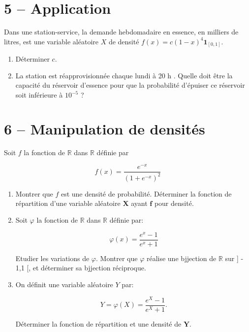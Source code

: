 \vspace{1cm}
\section*{5 -- Application}
Dans une station-service, la demande hebdomadaire en essence, en milliers de litres, est une variable aléatoire $X$ de densité $f(x)=c(1-x)^4 \mathbf{1}_{[0,1]}$.
\begin{enumerate}
  \item Déterminer $c$.

  \item La station est réapprovisionnée chaque lundi à 20 h . Quelle doit être la capacité du réservoir d'essence pour que la probabilité d'épuiser ce réservoir soit inférieure à $10^{-5}$ ?

\end{enumerate}

\vspace{2em}
\section*{6 -- Manipulation de densités}
Soit $f$ la fonction de $\mathbb{R}$ dans $\mathbb{R}$ définie par

$$
f(x)=\frac{e^{-x}}{\left(1+e^{-x}\right)^2}
$$

\begin{enumerate}
  \item Montrer que $f$ est une densité de probabilité. Déterminer la fonction de répartition d'une variable aléatoire $\boldsymbol{X}$ ayant $\boldsymbol{f}$ pour densité.

  \item Soit $\varphi$ la fonction de $\mathbb{R}$ dans $\mathbb{R}$ définie par:

$$
\varphi(x)=\frac{e^x-1}{e^x+1}
$$


Etudier les variations de $\varphi$. Montrer que $\varphi$ réalise une bjjection de $\mathbb{R}$ sur ] - 1,1 [, et déterminer sa bjjection réciproque.
  \item On définit une variable aléatoire $Y$ par:

$$
Y=\varphi(X)=\frac{e^X-1}{e^X+1} .
$$


Déterminer la fonction de répartition et une densité de $\boldsymbol{Y}$.
  \end{enumerate}

